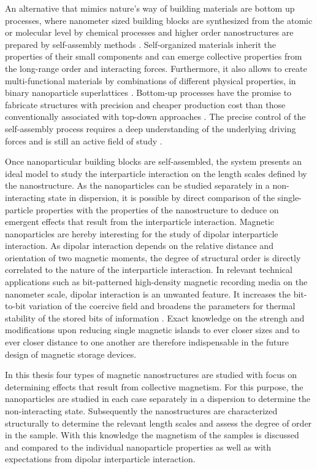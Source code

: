 \documentclass[\main/dresen_thesis.tex]{subfiles}
\begin{document}
  An alternative that mimics nature's way of building materials are bottom up processes, where nanometer sized building blocks are synthesized from the atomic or molecular level by chemical processes and higher order nanostructures are prepared by self-assembly methods \cite{Hannink_2006_Nanos, Whitesides_2002_Selfa}.
  Self-organized materials inherit the properties of their small components and can emerge collective properties from the long-range order and interacting forces.
  Furthermore, it also allows to create multi-functional materials by combinations of different physical properties, \eg in binary nanoparticle superlattices \cite{Redl_2003_Three}.
  Bottom-up processes have the promise to fabricate structures with precision and cheaper production cost than those conventionally associated with top-down approaches \cite{Hannink_2006_Nanos}.
  The precise control of the self-assembly process requires a deep understanding of the underlying driving forces and is still an active field of study \cite{Whitelam_2008_Thero, Powers_2016_Track, Josten_2017_Super}.

  Once nanoparticular building blocks are self-assembled, the system presents an ideal model to study the interparticle interaction on the length scales defined by the nanostructure.
  As the nanoparticles can be studied separately in a non-interacting state in dispersion, it is possible by direct comparison of the single-particle properties with the properties of the nanostructure to deduce on emergent effects that result from the interparticle interaction.
  Magnetic nanoparticles \cite{Lu_2007_Magne, Gubin_2005_Magne} are hereby interesting for the study of dipolar interparticle interaction.
  As dipolar interaction depends on the relative distance and orientation of two magnetic moments, the degree of structural order is directly correlated to the nature of the interparticle interaction.
  In relevant technical applications such as bit-patterned high-density magnetic recording media on the nanometer scale, dipolar interaction is an unwanted feature.
  It increases the bit-to-bit variation of the coercive field and broadens the parameters for thermal stability of the stored bits of information \cite{Eibagi_2012_Roleo}.
  Exact knowledge on the strengh and modifications upon reducing single magnetic islands to ever closer sizes and to ever closer distance to one another are therefore indispensable in the future design of magnetic storage devices.

    In this thesis four types of magnetic nanostructures are studied with focus on determining effects that result from collective magnetism.
    For this purpose, the nanoparticles are studied in each case separately in a dispersion to determine the non-interacting state.
    Subsequently the nanostructures are characterized structurally to determine the relevant length scales and assess the degree of order in the sample.
    With this knowledge the magnetism of the samples is discussed and compared to the individual nanoparticle properties as well as with expectations from dipolar interparticle interaction.
\end{document}
